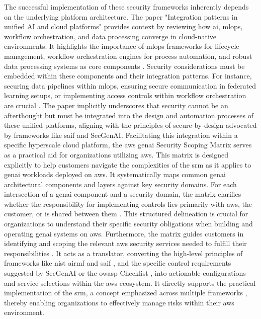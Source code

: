 The successful implementation of these security frameworks inherently depends on the underlying platform architecture. The paper "Integration patterns in unified AI and cloud platforms" provides context by reviewing how \gls{ai}, \gls{mlops}, workflow orchestration, and data processing converge in cloud-native environments\cite{sushil_prabhu_prabhakaran_integration_2024}. It highlights the importance of \gls{mlops} frameworks for lifecycle management, workflow orchestration engines for process automation, and robust data processing systems as core components \cite{sushil_prabhu_prabhakaran_integration_2024}. Security considerations must be embedded within these components and their integration patterns. For instance, securing data pipelines within \gls{mlops}, ensuring secure communication in federated learning setups, or implementing access controls within workflow orchestration are crucial \cite{sushil_prabhu_prabhakaran_integration_2024, hansen_introducing_2023, haryanto_secgenai_2024}. The paper implicitly underscores that security cannot be an afterthought but must be integrated into the design and automation processes of these unified platforms, aligning with the principles of secure-by-design advocated by frameworks like \gls{saif} and SecGenAI.
Facilitating this integration within a specific hyperscale cloud platform, the \gls{aws} \gls{genai} Security Scoping Matrix serves as a practical aid for organizations utilizing \gls{aws}\cite{noauthor_securing_nodate}. This matrix is designed explicitly to help customers navigate the complexities of the \gls{srm} as it applies to \gls{genai} workloads deployed on \gls{aws}. It systematically maps common \gls{genai} architectural components and layers against key security domains\cite{noauthor_securing_nodate}. For each intersection of a \gls{genai} component and a security domain, the matrix clarifies whether the responsibility for implementing controls lies primarily with \gls{aws}, the customer, or is shared between them \cite{noauthor_securing_nodate}. This structured delineation is crucial for organizations to understand their specific security obligations when building and operating \gls{genai} systems on \gls{aws}. Furthermore, the matrix guides customers in identifying and scoping the relevant \gls{aws} security services needed to fulfill their responsibilities \cite{noauthor_securing_nodate}. It acts as a translator, converting the high-level principles of frameworks like \gls{nist} \gls{airmf} \cite{tabassi_artificial_2023} and \gls{saif} \cite{hansen_introducing_2023}, and the specific control requirements suggested by SecGenAI \cite{haryanto_secgenai_2024} or the \gls{owasp} Checklist \cite{editor_llm_nodate}, into actionable configurations and service selections within the \gls{aws} ecosystem. It directly supports the practical implementation of the \gls{srm}, a concept emphasized across multiple frameworks \cite{tabassi_artificial_2023, hansen_introducing_2023, haryanto_secgenai_2024, editor_llm_nodate}, thereby enabling organizations to effectively manage risks within their \gls{aws} environment.

